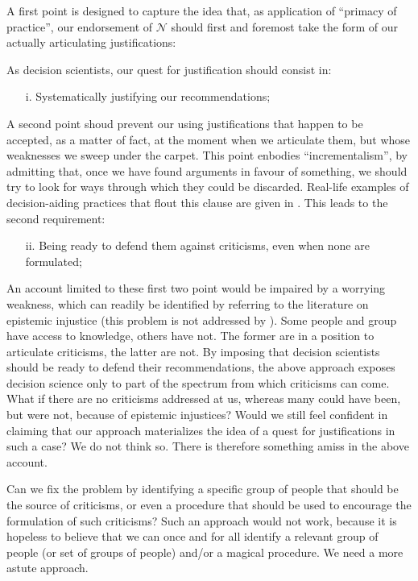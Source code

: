 \documentclass[preprint, french, english, 11pt, authoryear]{elsarticle}%
\newcommand{\adv}{\mathscr{N}}
\begin{document}
A first point is designed to capture the idea that, as application of ``primacy of practice'', our endorsement of $\adv$ should first and foremost take the form of our actually articulating justifications:

As decision scientists, our quest for justification should consist in:
\begin{itemize}
\item[i.]	Systematically justifying our recommendations;
\end{itemize}

A second point shoud prevent our using justifications that happen to be accepted, as a matter of fact, at the moment when we articulate them, but whose weaknesses we sweep under the carpet. This point enbodies ``incrementalism'', by admitting that, once we have found arguments in favour of something, we should try to look for ways through which they could be discarded. Real-life examples of decision-aiding practices that flout this clause are given in \cite{meinard_what_2017}. This leads to the second requirement:

\begin{itemize}
\item[ii.]	Being ready to defend them against criticisms, even when none are formulated;
\end{itemize}

An account limited to these first two point would be impaired by a worrying weakness, which can readily be identified by referring to the literature on epistemic injustice \cite{fricker_epistemic_2007} (this problem is not addressed by \cite{meinard_what_2017}). Some people and group have access to knowledge, others have not. The former are in a position to articulate criticisms, the latter are not. By imposing that decision scientists should be ready to defend their recommendations, the above approach exposes decision science only to part of the spectrum from which criticisms can come. What if there are no criticisms addressed at us, whereas many could have been, but were not, because of epistemic injustices? 
Would we still feel confident in claiming that our approach materializes the idea of a quest for justifications in such a case? We do not think so. There is therefore something amiss in the above account.

Can we fix the problem by identifying a specific group of people that should be the source of criticisms, or even a procedure that should be used to encourage the formulation of such criticisms? Such an approach would not work, because it is hopeless to believe that we can once and for all identify a relevant group of people (or set of groups of people) and/or a magical procedure. We need a more astute approach.
\end{document}
